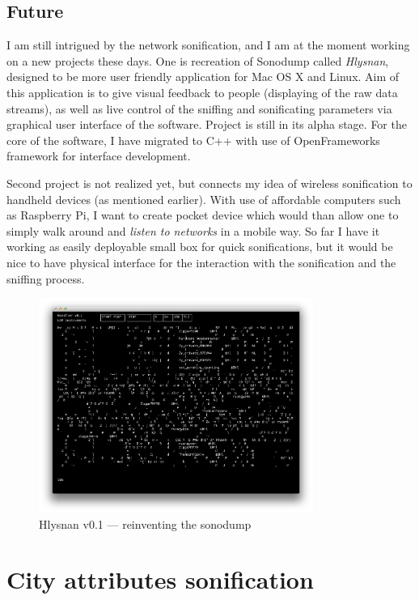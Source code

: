 \documentclass[12pt,a4paper,oneside]{report}
\begin{document}
\subsection{Future}
I am still intrigued by the network sonification, and I am at the moment working on a new projects these days. One is recreation of Sonodump called \textit{Hlysnan}, designed to be more user friendly application for Mac OS X and Linux. Aim of this application is to give visual feedback to people (displaying of the raw data streams), as well as live control of the sniffing and sonificating parameters via graphical user interface of the software. Project is still in its alpha stage. For the core of the software, I have migrated to C++ with use of OpenFrameworks framework for interface development.

Second project is not realized yet, but connects my idea of wireless sonification to handheld devices (as mentioned earlier). With use of affordable computers such as Raspberry Pi, I want to create pocket device which would than allow one to simply walk around and \emph{listen to networks} in a mobile way. So far I have it working as easily deployable small box for quick sonifications, but it would be nice to have physical interface for the interaction with the sonification and the sniffing process.

\begin{figure}  
  \centering
    \includegraphics[width=0.8\textwidth]{img/hlysnan}%
	\caption{Hlysnan v0.1 --- reinventing the sonodump}
	\label{fig:hlysnan}
\end{figure}


\clearpage
\section{City attributes sonification}
\end{document}
